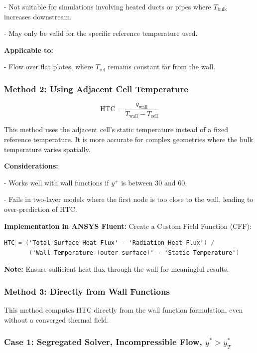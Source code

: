 \documentclass[12pt]{article}
\begin{document}
- Not suitable for simulations involving heated ducts or pipes where $ T_{\text{bulk}} $ increases downstream.
    
- May only be valid for the specific reference temperature used.

\textbf{Applicable to:}
   
- Flow over flat plates, where $ T_{\text{ref}} $ remains constant far from the wall.

\subsubsection{Method 2: Using Adjacent Cell Temperature}

$$
\text{HTC} = \frac{q_{\text{wall}}}{T_{\text{wall}} - T_{\text{cell}}}
$$

This method uses the adjacent cell's static temperature instead of a fixed reference temperature. It is more accurate for complex geometries where the bulk temperature varies spatially.

\textbf{Considerations:}

- Works well with wall functions if $ y^+ $ is between 30 and 60.
    
- Fails in two-layer models where the first node is too close to the wall, leading to over-prediction of HTC.

\textbf{Implementation in ANSYS Fluent:}
Create a Custom Field Function (CFF):

\begin{lstlisting}[language=C]
HTC = ('Total Surface Heat Flux' - 'Radiation Heat Flux') / 
       ('Wall Temperature (outer surface)' - 'Static Temperature')
\end{lstlisting}

\textbf{Note:} Ensure sufficient heat flux through the wall for meaningful results.

\subsubsection{Method 3: Directly from Wall Functions} %

This method computes HTC directly from the wall function formulation, even without a converged thermal field.

\subsubsection*{Case 1: Segregated Solver, Incompressible Flow, $ y^* > y^*_T $}
\end{document}
